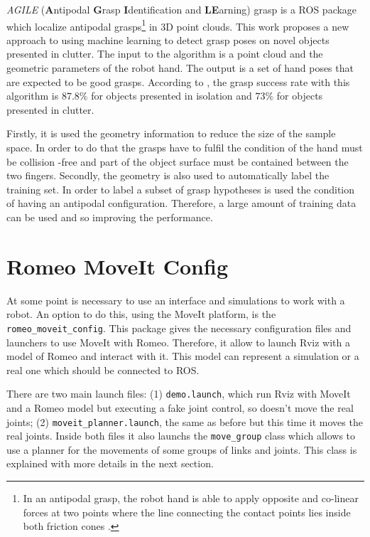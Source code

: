 \documentclass[12pt,a4paper,final,twoside,openright]{report}
\begin{document}
\textit{AGILE} (\textbf{A}ntipodal \textbf{G}rasp \textbf{I}dentification and \textbf{LE}arning) grasp is a ROS package \cite{Pas} which localize antipodal grasps\footnote{In an antipodal grasp, the robot hand is able to apply opposite and co-linear forces at two points where the line connecting the contact points lies inside both friction cones \cite{DBLP:journals/corr/PasP15}.} in 3D point clouds. This work \cite{DBLP:journals/corr/PasP15} proposes a new approach to using machine learning to detect grasp poses on novel objects presented in clutter. The input to the algorithm is a point cloud and the geometric parameters of the robot hand. The output is a set of hand poses that are expected to be good grasps. According to \cite{DBLP:journals/corr/PasP15}, the grasp success rate with this algorithm is $87.8 \%$ for objects presented in isolation and $73 \%$ for objects presented in clutter. 

Firstly, it is used the geometry information to reduce the size of the sample space. In order to do that the grasps have to fulfil the condition of the hand must be collision -free and part of the object surface must be contained between the two fingers. Secondly, the geometry is also used to automatically label the training set. In order to label a subset of grasp hypotheses is used the condition of having an antipodal configuration. Therefore, a large amount of training data can be used and so improving the performance.

\section{Romeo MoveIt Config}
\label{sec:romeo_moveit_config}

At some point is necessary to use an interface and simulations to work with a robot. An option to do this, using the MoveIt platform, is the \texttt{romeo\_moveit\_config}. This package gives the necessary configuration files and launchers to use MoveIt with Romeo. Therefore, it allow to launch Rviz with a model of Romeo and interact with it. This model can represent a simulation or a real one which should be connected to ROS.

There are two main launch files: (1) \texttt{demo.launch}, which run Rviz with MoveIt and a Romeo model but executing a fake joint control, so doesn't move the real joints; (2) \texttt{moveit\_planner.launch}, the same as before but this time it moves the real joints. Inside both files it also launchs the \texttt{move\_group} class which allows to use a planner for the movements of some groups of links and joints. This class is explained with more details in the next section.
\end{document}
